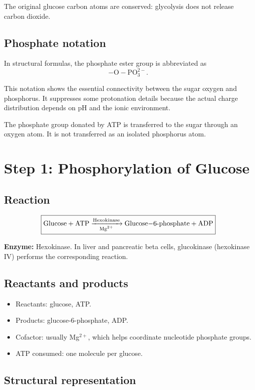 \documentclass[11pt,a4paper]{article}
\newcommand{\Enz}[1]{\textbf{Enzyme:} #1}
\begin{document}
The original glucose carbon atoms are conserved: glycolysis does not
release carbon dioxide.

\subsection{Phosphate notation}

In structural formulas, the phosphate ester group is abbreviated as
\[
\mathrm{-O-PO_3^{2-}}.
\]

This notation shows the essential connectivity between the sugar oxygen
and phosphorus. It suppresses some protonation details because the
actual charge distribution depends on pH and the ionic environment.

The phosphate group donated by ATP is transferred to the sugar through
an oxygen atom. It is not transferred as an isolated phosphorus atom.

\section{Step 1: Phosphorylation of Glucose}
\label{step:1}

\subsection{Reaction}

\[
\boxed{
\ce{Glucose + ATP ->[Hexokinase][Mg^{2+}] Glucose-6-phosphate + ADP}
}
\]

\Enz{Hexokinase. In liver and pancreatic beta cells, glucokinase
(hexokinase IV) performs the corresponding reaction.}

\subsection{Reactants and products}

\begin{itemize}
  \item Reactants: glucose, ATP.
  \item Products: glucose-6-phosphate, ADP.
  \item Cofactor: usually Mg$^{2+}$, which helps coordinate nucleotide
  phosphate groups.
  \item ATP consumed: one molecule per glucose.
\end{itemize}

\subsection{Structural representation}
\end{document}
